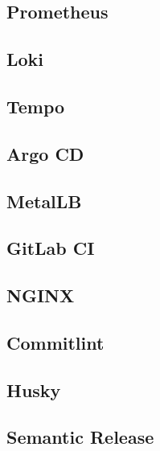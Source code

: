 \subsection{Prometheus}


\subsection{Loki}


\subsection{Tempo}


\subsection{Argo CD}


\subsection{MetalLB}


\subsection{GitLab CI}


\subsection{NGINX}


\subsection{Commitlint}


\subsection{Husky}


\subsection{Semantic Release}

